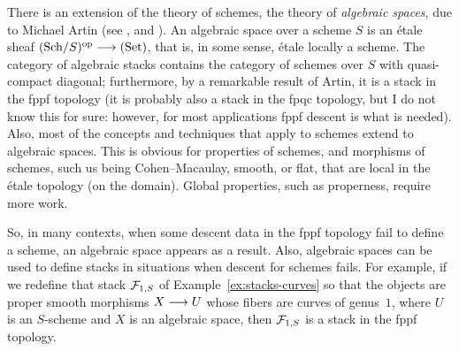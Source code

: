 \begin{4   STACKS}
\begin{4.4 Descent along torsors}
\begin{remark}\label{rmk:algebraic-spaces}
There is an extension of the theory of schemes, the theory of \emph{algebraic spaces}, due to Michael Artin (see \cite{artin-algspaces}, \cite{artinrep} and \cite{knutson}). An algebraic space over a scheme $S$ is an \'etale sheaf $\catsch{S}\op \arr \catset$, that is, in some sense, \'etale locally a scheme. The category of algebraic stacks contains the category of schemes over $S$ with quasi-compact diagonal; furthermore, by a remarkable result of Artin, it is a stack in the fppf topology (it is probably also a stack in the fpqc topology, but I do not know this for sure: however, for most applications fppf descent is what is needed). Also, most of the concepts and techniques that apply to schemes extend to algebraic spaces. This is obvious for properties of schemes, and morphisms of schemes, such us being Cohen--Macaulay, smooth, or flat, that are local in the \'etale topology (on the domain). Global properties, such as properness, require more work.

So, in many contexts, when some descent data in the fppf topology fail to define a scheme, an algebraic space appears as a result. Also, algebraic spaces can be used to define stacks in situations when descent for schemes fails. For example, if we redefine that stack $\mathcal{F}_{1,S}$ of Example~\ref{ex:stacks-curves} so that the objects are proper smooth morphisms $X \arr U$ whose fibers are curves of genus~$1$, where $U$ is an $S$-scheme and $X$ is an algebraic space, then $\mathcal{F}_{1,S}$ is a stack in the fppf topology.
\end{remark}


\end{4.4 Descent along torsors}
\end{4   STACKS}





\nocite{moerdijk02}
\nocite{knus-ojanguren-descent}
\nocite{benabou-roubaud}
\nocite{giraud}
\nocite{giraud-descent}
